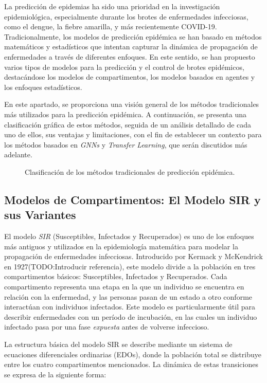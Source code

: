 La predicción de epidemias ha sido una prioridad en la investigación epidemiológica, especialmente durante los brotes de enfermedades infecciosas, como el dengue, la fiebre amarilla, y más recientemente COVID-19. Tradicionalmente, los modelos de predicción epidémica se han basado en métodos matemáticos y estadísticos que intentan capturar la dinámica de propagación de enfermedades a través de diferentes enfoques. En este sentido, se han propuesto varios tipos de modelos para la predicción y el control de brotes epidémicos, destacándose los modelos de compartimentos, los modelos basados en agentes y los enfoques estadísticos. 

En este apartado, se proporciona una visión general de los métodos tradicionales más utilizados para la predicción epidémica. A continuación, se presenta una clasificación gráfica de estos métodos, seguida de un análisis detallado de cada uno de ellos, sus ventajas y limitaciones, con el fin de establecer un contexto para los métodos basados en \textit{GNNs}  y \textit{Transfer Learning}, que serán discutidos más adelante.

\begin{figure}[H]
\centering
\caption{Clasificación de los métodos tradicionales de predicción epidémica.}
\end{figure}

\subsection{Modelos de Compartimentos: El Modelo SIR y sus Variantes}\label{section:sir-model}

El modelo \textit{SIR} (Susceptibles, Infectados y Recuperados) es uno de los enfoques más antiguos y utilizados en la epidemiología matemática para modelar la propagación de enfermedades infecciosas. Introducido por Kermack y McKendrick en 1927(TODO:Introducir referencia), este modelo divide a la población en tres compartimentos básicos: Susceptibles, Infectados y Recuperados. Cada compartimento representa una etapa en la que un individuo se encuentra en relación con la enfermedad, y las personas pasan de un estado a otro conforme interactúan con individuos infectados. Este modelo es particularmente útil para describir enfermedades con un período de incubación, en las cuales un individuo infectado pasa por una fase \textit{expuesta} antes de volverse infeccioso. 

La estructura básica del modelo SIR se describe mediante un sistema de ecuaciones diferenciales ordinarias (EDOs), donde la población total se distribuye entre los cuatro compartimentos mencionados. La dinámica de estas transiciones se expresa de la siguiente forma:

